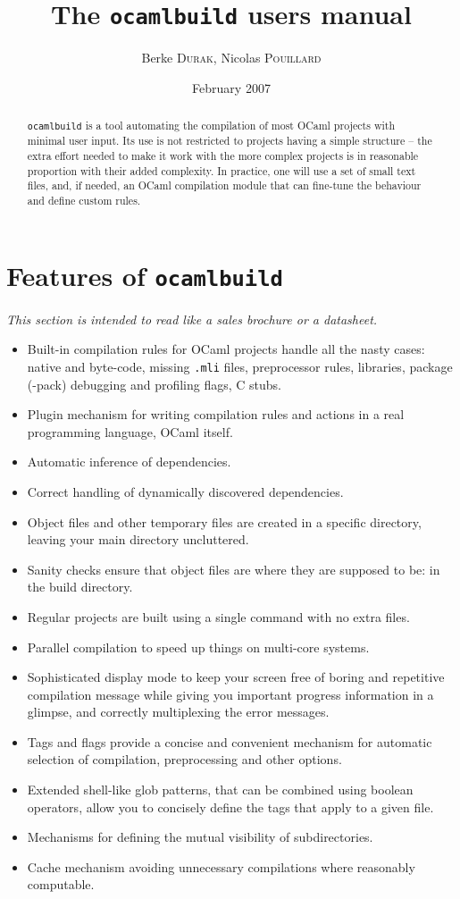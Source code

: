 \documentclass[9pt]{article}
\newcommand{\ocb}{\texttt{ocamlbuild}\xspace}
\begin{document}
\title{The \ocb users manual}
\author{Berke \textsc{Durak}, Nicolas \textsc{Pouillard}}
\date{February 2007}
\maketitle
\begin{abstract}
\ocb is a tool automating the compilation of most OCaml projects with minimal
user input.  Its use is not restricted to projects having a simple structure --
the extra effort needed to make it work with the more complex projects is in
reasonable proportion with their added complexity.  In practice, one will use a
set of small text files, and, if needed, an OCaml compilation module that can
fine-tune the behaviour and define custom rules.
\end{abstract}
\section{Features of \ocb}
{\em This section is intended to read like a sales brochure or a datasheet.}

\begin{itemize}
\item Built-in compilation rules for OCaml projects handle all the nasty cases:
native and byte-code, missing \texttt{.mli} files, preprocessor rules,
libraries, package (-pack) debugging and profiling flags, C stubs.
\item Plugin mechanism for writing compilation rules and actions in a real programming language,
OCaml itself.
\item Automatic inference of dependencies.
\item Correct handling of dynamically discovered dependencies.
\item Object files and other temporary files are created in a specific directory, leaving your main directory uncluttered.
\item Sanity checks ensure that object files are where they are supposed to be: in the build directory.
\item Regular projects are built using a single command with no extra files.
\item Parallel compilation to speed up things on multi-core systems.
\item Sophisticated display mode to keep your screen free of boring and repetitive compilation message
while giving you important progress information in a glimpse, and correctly multiplexing the error messages.
\item Tags and flags provide a concise and convenient mechanism for automatic selection of compilation, preprocessing and
other options.
\item Extended shell-like glob patterns, that can be combined using boolean operators,
allow you to concisely define the tags that apply to a given file.
\item Mechanisms for defining the mutual visibility of subdirectories.
\item Cache mechanism avoiding unnecessary compilations where reasonably computable.
\end{itemize}
\end{document}

